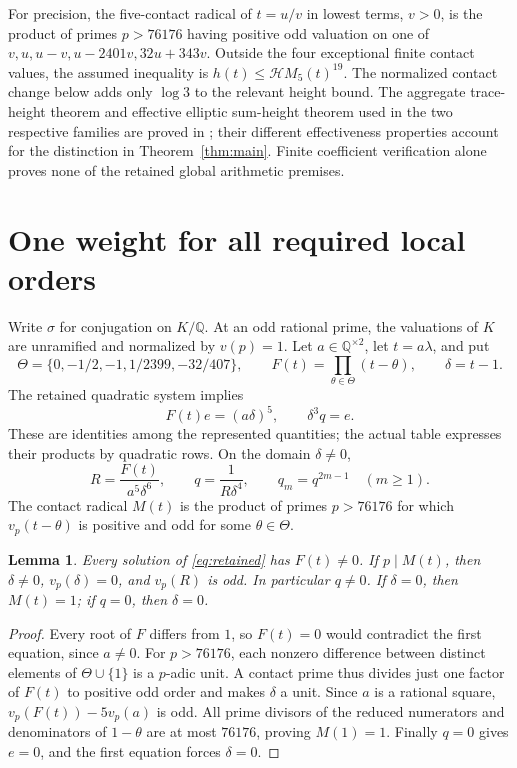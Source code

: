 \documentclass[11pt,a4paper]{article}
\newtheorem{lemma}[theorem]{Lemma}
\theoremstyle{remark}\newtheorem{remark}[theorem]{Remark}
\newcommand{\Q}{\mathbb Q}\newcommand{\Z}{\mathbb Z}\newcommand{\HH}{\mathcal H}
\begin{document}
For precision, the five-contact radical of $t=u/v$ in lowest terms,
$v>0$, is the product of primes $p>76176$ having positive odd valuation
on one of $v,u,u-v,u-2401v,32u+343v$. Outside the four exceptional
finite contact values, the assumed inequality is
$h(t)\le\HH M_5(t)^{19}$. The normalized contact change below adds only
$\log3$ to the relevant height bound. The aggregate trace-height theorem
and effective elliptic sum-height theorem used in the two respective
families are proved in \cite{Aggregate,Sums}; their different effectiveness
properties account for the distinction in Theorem~\ref{thm:main}.
Finite coefficient verification alone proves none of the retained global
arithmetic premises.

\section{One weight for all required local orders}
Write $\sigma$ for conjugation on $K/\Q$. At an odd rational prime,
the valuations of $K$ are unramified and normalized by $v(p)=1$.
Let $a\in\Q^{\times2}$, let $t=a\lambda$, and put
\[
 \Theta=\{0,-1/2,-1,1/2399,-32/407\},\qquad
 F(t)=\prod_{\theta\in\Theta}(t-\theta),\qquad \delta=t-1.
\]
The retained quadratic system implies
\begin{equation}\label{eq:retained}
 F(t)e=(a\delta)^5,\qquad \delta^3q=e.
\end{equation}
These are identities among the represented quantities; the actual table
expresses their products by quadratic rows. On the domain $\delta\ne0$,
\begin{equation}\label{eq:weights}
 R=\frac{F(t)}{a^5\delta^6},\qquad
 q=\frac1{R\delta^4},\qquad q_m=q^{2m-1}\quad(m\ge1).
\end{equation}
The contact radical $M(t)$ is the product of primes $p>76176$ for which
$v_p(t-\theta)$ is positive and odd for some $\theta\in\Theta$.

\begin{lemma}\label{lem:domain}
Every solution of \eqref{eq:retained} has $F(t)\ne0$. If $p\mid M(t)$,
then $\delta\ne0$, $v_p(\delta)=0$, and $v_p(R)$ is odd. In particular
$q\ne0$. If $\delta=0$, then $M(t)=1$; if $q=0$, then $\delta=0$.
\end{lemma}
\begin{proof}
Every root of $F$ differs from $1$, so $F(t)=0$ would contradict the
first equation, since $a\ne0$. For $p>76176$, each nonzero difference
between distinct elements of $\Theta\cup\{1\}$ is a $p$-adic unit.
A contact prime thus divides just one factor of $F(t)$ to positive odd
order and makes $\delta$ a unit. Since $a$ is a rational square,
$v_p(F(t))-5v_p(a)$ is odd. All prime divisors of the reduced numerators
and denominators of $1-\theta$ are at most $76176$, proving $M(1)=1$.
Finally $q=0$ gives $e=0$, and the first equation forces $\delta=0$.
\end{proof}
\end{document}
